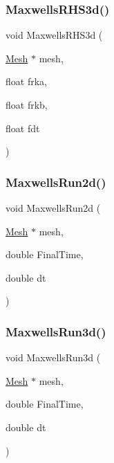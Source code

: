 \mbox{\label{a00554_a819aa63bee26ada32119a2a58ddab139}} 
\subsubsection{\texorpdfstring{Maxwells\+R\+H\+S3d()}{MaxwellsRHS3d()}}
{\footnotesize\ttfamily void Maxwells\+R\+H\+S3d (\begin{DoxyParamCaption}\item[{\hyperlink{a00557_aeffbe0891ab73a4d8964c9cb7978426e}{Mesh} $\ast$}]{mesh,  }\item[{float}]{frka,  }\item[{float}]{frkb,  }\item[{float}]{fdt }\end{DoxyParamCaption})}

\mbox{\label{a00554_a08cfe992d80b7b195cfd3a3c366b8f65}} 
\subsubsection{\texorpdfstring{Maxwells\+Run2d()}{MaxwellsRun2d()}}
{\footnotesize\ttfamily void Maxwells\+Run2d (\begin{DoxyParamCaption}\item[{\hyperlink{a00557_aeffbe0891ab73a4d8964c9cb7978426e}{Mesh} $\ast$}]{mesh,  }\item[{double}]{Final\+Time,  }\item[{double}]{dt }\end{DoxyParamCaption})}

\mbox{\label{a00554_a630113a871c79c54d968c6c233e59145}} 
\subsubsection{\texorpdfstring{Maxwells\+Run3d()}{MaxwellsRun3d()}}
{\footnotesize\ttfamily void Maxwells\+Run3d (\begin{DoxyParamCaption}\item[{\hyperlink{a00557_aeffbe0891ab73a4d8964c9cb7978426e}{Mesh} $\ast$}]{mesh,  }\item[{double}]{Final\+Time,  }\item[{double}]{dt }\end{DoxyParamCaption})}

